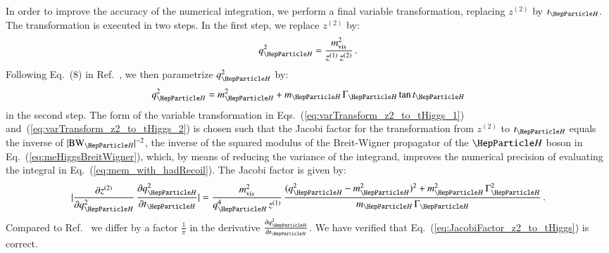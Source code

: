 In order to improve the accuracy of the numerical integration,
we perform a final variable transformation, replacing $z^{(2)}$ by $t_{\PHiggs}$.
The transformation is executed in two steps. 
In the first step, we replace $z^{(2)}$ by:
\begin{equation}
q_{\PHiggs}^{2} = \frac{m^{2}_{\vis}}{z^{(1)} \, z^{(2)}} \, .
\label{eq:varTransform_z2_to_tHiggs_1}
\end{equation}
Following Eq.~(8) in Ref.~\cite{Alwall:2010cq}, we then parametrize $q_{\PHiggs}^{2}$ by:
\begin{equation}
q_{\PHiggs}^{2} = m_{\PHiggs}^{2} + m_{\PHiggs} \, \Gamma_{\PHiggs}
\tan t_{\PHiggs} 
\label{eq:varTransform_z2_to_tHiggs_2}
\end{equation}
in the second step.
The form of the variable transformation in Eqs.~(\ref{eq:varTransform_z2_to_tHiggs_1}) and~(\ref{eq:varTransform_z2_to_tHiggs_2}) 
is chosen such that the Jacobi factor for the transformation from
$z^{(2)}$ to $t_{\PHiggs}$ equals the inverse of $\vert \BW_{\PHiggs}
\vert^{-2}$, the inverse of the squared modulus
of the Breit-Wigner propagator of the $\PHiggs$ boson in
Eq.~(\ref{eq:meHiggsBreitWigner}),
which, by means of reducing the variance of the integrand,
improves the numerical precision of evaluating the integral 
in Eq.~(\ref{eq:mem_with_hadRecoil}).
The Jacobi factor is given by:
\begin{equation}
\lvert \frac{\partial z^{(2)}}{\partial q_{\PHiggs}^{2}} \, \frac{\partial
  q_{\PHiggs}^{2}}{\partial t_{\PHiggs}} \rvert =
\frac{m^{2}_{\vis}}{q_{\PHiggs}^{4} \, z^{(1)}} \, \frac{(q_{\PHiggs}^{2}
  - m_{\PHiggs}^{2})^{2} + m_{\PHiggs}^{2} \,
  \Gamma_{\PHiggs}^{2}}{m_{\PHiggs} \, \Gamma_{\PHiggs}} \, .
\label{eq:JacobiFactor_z2_to_tHiggs}  
\end{equation}
Compared to Ref.~\cite{Alwall:2010cq} we differ by a factor $\frac{1}{\pi}$ in the derivative 
$\frac{\partial q_{\PHiggs}^{2}}{\partial t_{\PHiggs}}$. We have verified that Eq.~(\ref{eq:JacobiFactor_z2_to_tHiggs}) is correct.

